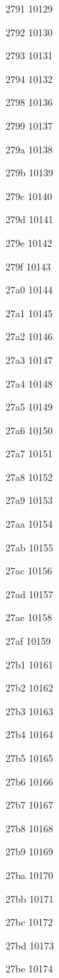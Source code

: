 \documentclass[11pt]{article}
\begin{document}
2791 10129 

2792 10130 

2793 10131 

2794 10132 

2798 10136 

2799 10137 

279a 10138 

279b 10139 

279c 10140 

279d 10141 

279e 10142 

279f 10143 

27a0 10144 

27a1 10145 

27a2 10146 

27a3 10147 

27a4 10148 

27a5 10149 

27a6 10150 

27a7 10151 

27a8 10152 

27a9 10153 

27aa 10154 

27ab 10155 

27ac 10156 

27ad 10157 

27ae 10158 

27af 10159 

27b1 10161 

27b2 10162 

27b3 10163 

27b4 10164 

27b5 10165 

27b6 10166 

27b7 10167 

27b8 10168 

27b9 10169 

27ba 10170 

27bb 10171 

27bc 10172 

27bd 10173 

27be 10174 
\end{document}
